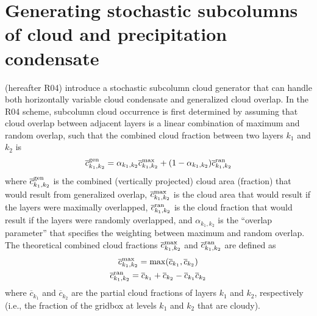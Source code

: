 \section{Generating stochastic subcolumns of cloud and precipitation condensate}
\label{subgrid2_generator_section}
\cite{raisanen_et_al_2004} (hereafter R04) introduce a stochastic subcolumn cloud generator that can handle both horizontally variable cloud condensate and generalized cloud overlap. In the R04 scheme, subcolumn cloud occurrence is first determined by assuming that cloud overlap between adjacent layers is a linear combination of maximum and random overlap, such that the combined cloud fraction between two layers $k_1$ and $k_2$ is
\begin{gather}
\overline{c}_{k_1, k_2}^{\rm gen} = \alpha_{k_1, k_2} \overline{c}_{k_1, k_2}^{\rm max} + (1 - \alpha_{k_1, k_2})
\overline{c}_{k_1, k_2}^{\rm ran}
    \label{generalized_overlap_equation}
\end{gather}
where $\overline{c}_{k_1, k_2}^{\rm gen}$ is the combined (vertically projected) cloud area (fraction) that would result from generalized overlap, $\overline{c}_{k_1, k_2}^{\rm max}$ is the cloud area that would result if the layers were maximally overlapped, $\overline{c}_{k_1, k_2}^{\rm ran}$ is the cloud fraction that would result if the layers were randomly overlapped, and $\alpha_{k_1, k_2}$ is the ``overlap parameter'' that specifies the weighting between maximum and random overlap. The theoretical combined cloud fractions $\overline{c}^{\rm max}_{k_1, k_2}$ and $\overline{c}^{\rm ran}_{k_1, k_2}$ are defined as
\begin{gather}
    \overline{c}^{\rm max}_{k_1, k_2} = \max(\overline{c}_{k_1},\overline{ c}_{k_2}) \\
    \overline{c}^{\rm ran}_{k_1, k_2} = \overline{c}_{k_1} + \overline{c}_{k_2} - \overline{c}_{k_1} \overline{c}_{k_2}
\end{gather}
where $\overline{c}_{k_1}$ and $\overline{c}_{k_2}$ are the partial cloud fractions of layers $k_1$ and $k_2$, respectively (i.e., the fraction of the gridbox at levels $k_1$ and $k_2$ that are cloudy).

